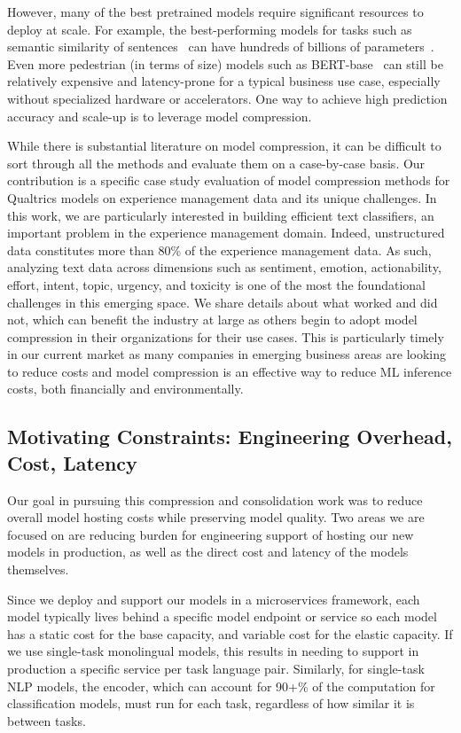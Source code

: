 However, many of the best pretrained models require significant resources to deploy at scale. 
For example, the best-performing models for tasks such as semantic similarity of sentences~\cite{wang2018glue} can have hundreds of billions of parameters~\cite{smith2022using}.
Even more pedestrian (in terms of size) models such as BERT-base~\cite{devlin-etal-2019-bert} can still be relatively expensive and latency-prone for a typical business use case, especially without specialized hardware or accelerators.
One way to achieve high prediction accuracy and scale-up is to leverage model compression.

While there is substantial literature on model compression, it can be difficult to sort through all the methods and evaluate them on a case-by-case basis.
Our contribution is a specific case study evaluation of model compression methods for Qualtrics models on experience management data and its unique challenges.
In this work, we are particularly interested in building efficient text classifiers, an important problem in the experience management domain. 
Indeed, unstructured data constitutes more than 80\% of the experience management data.
As such, analyzing text data across dimensions such as sentiment, emotion, actionability, effort, intent, topic, urgency, and toxicity is one of the most the foundational challenges in this emerging space. 
We share details about what worked and did not, which can benefit the industry at large as others begin to adopt model compression in their organizations for their use cases.
This is particularly timely in our current market as many companies in emerging business areas are looking to reduce costs and model compression is an effective way to reduce ML inference costs, both financially and environmentally.

\subsection*{Motivating Constraints: Engineering Overhead, Cost, Latency}
Our goal in pursuing this compression and consolidation work was to reduce overall model hosting costs while preserving model quality.
Two areas we are focused on are reducing burden for engineering support of hosting our new models in production, as well as the direct cost and latency of the models themselves.

Since we deploy and support our models in a microservices framework, each model typically lives behind a specific model endpoint or service so each model has a static cost for the base capacity, and variable cost for the elastic capacity.
If we use single-task monolingual models, this results in needing to support in production a specific service per task language pair.
Similarly, for single-task NLP models, the encoder, which can account for 90+\% of the computation for classification models, must run for each task, regardless of how similar it is between tasks.

